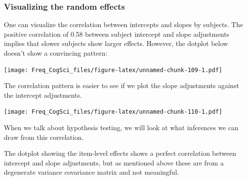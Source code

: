 \documentclass[12pt,]{krantz}
\newenvironment{Shaded}{\begin{snugshade}}{\end{snugshade}}
\newcommand{\DataTypeTok}[1]{\textcolor[rgb]{0.13,0.29,0.53}{#1}}
\newcommand{\DecValTok}[1]{\textcolor[rgb]{0.00,0.00,0.81}{#1}}
\newcommand{\KeywordTok}[1]{\textcolor[rgb]{0.13,0.29,0.53}{\textbf{#1}}}
\newcommand{\NormalTok}[1]{#1}
\newcommand{\OperatorTok}[1]{\textcolor[rgb]{0.81,0.36,0.00}{\textbf{#1}}}
\newcommand{\OtherTok}[1]{\textcolor[rgb]{0.56,0.35,0.01}{#1}}
\newcommand{\StringTok}[1]{\textcolor[rgb]{0.31,0.60,0.02}{#1}}
\begin{document}
\hypertarget{visualizing-the-random-effects}{%
\subsubsection{Visualizing the random effects}\label{visualizing-the-random-effects}}

One can visualize the correlation between intercepts and slopes by subjects. The positive correlation of 0.58 between subject intercept and slope adjustments implies that slower subjects show larger effects. However, the dotplot below doesn't show a convincing pattern:

\begin{Shaded}
\end{Shaded}

\texttt{[image: Freq\_CogSci\_files/figure-latex/unnamed-chunk-109-1.pdf]}

The correlation pattern is easier to see if we plot the slope adjustments against the intercept adjustments.

\begin{Shaded}
\end{Shaded}

\texttt{[image: Freq\_CogSci\_files/figure-latex/unnamed-chunk-110-1.pdf]}

When we talk about hypothesis testing, we will look at what inferences we can draw from this correlation.

The dotplot showing the item-level effects shows a perfect correlation between intercept and slope adjustments, but as mentioned above these are from a degenerate variance covariance matrix and not meaningful.

\begin{Shaded}
\end{Shaded}
\end{document}
